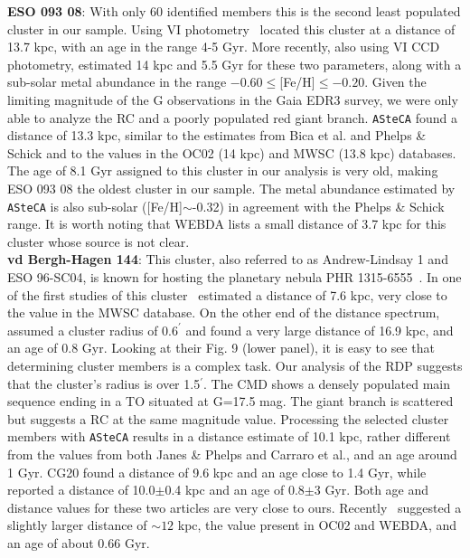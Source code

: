 \documentclass{aa}
\begin{document}
\begin{appendix}
  \noindent \textbf{ESO 093 08}: With only 60 identified members this is the second least
  populated cluster in our sample. Using VI photometry~\cite{Bica_1999} located
  this cluster at a distance of 13.7 kpc, with an age in the range 4-5 Gyr.
  More recently, also using VI CCD photometry, \cite{Phelps_2003} estimated 14
  kpc and 5.5 Gyr for these two parameters, along with a sub-solar metal
  abundance in the range $-0.60\leq$[Fe/H]$\leq-0.20$.
  Given the limiting magnitude of the G observations in the Gaia EDR3 survey, we
  were only able to analyze the RC and a poorly populated red giant branch.
  \texttt{ASteCA} found a distance of 13.3 kpc, similar to the estimates from
  Bica et al. and Phelps \& Schick and to  the values in the OC02 (14 kpc)
  and MWSC (13.8 kpc) databases.
  The age of 8.1 Gyr assigned to this cluster in our analysis is very
  old, making ESO 093 08 the oldest cluster in our sample. The metal
  abundance estimated by \texttt{ASteCA} is also sub-solar ([Fe/H]$\sim$-0.32)
  in agreement with the Phelps \& Schick range. It is worth noting that WEBDA
  lists a small distance of 3.7 kpc for this cluster whose source is not
  clear.\\

  \noindent \textbf{vd Bergh-Hagen 144}: This cluster, also referred to as Andrew-Lindsay
  1 and ESO 96-SC04, is known for hosting the planetary nebula PHR
  1315-6555~\citep{Parker_2011}.
  In one of the first studies of this cluster~\cite{Janes_1994} estimated a
  distance of 7.6 kpc, very close to the value in the MWSC database. On the
  other end of the distance spectrum,
  \cite{Carraro_2005_neglected} assumed a cluster radius of $0.6^{\prime}$ and
  found a very large distance of 16.9 kpc, and an age of 0.8 Gyr. Looking at
  their Fig. 9 (lower panel), it is easy to see that determining cluster members
  is a complex task. Our analysis of the RDP suggests that the cluster's radius
  is over 1.5$^{\prime}$. The CMD shows a densely populated main sequence ending
  in a TO situated at G=17.5 mag. The giant branch is scattered but suggests a
  RC at the same magnitude value.
  Processing the selected cluster members with \texttt{ASteCA} results in a
  distance estimate of 10.1 kpc, rather different from the values
  from both Janes \& Phelps and Carraro et al., and an age around 1 Gyr.
  CG20 found a distance of 9.6 kpc and an age close to 1.4 Gyr,
  while~\cite{Majaess_2014} reported a distance of 10.0$\pm$0.4 kpc and an
  age of 0.8$\pm$3 Gyr. Both age and distance values for these two articles are
  very close to ours. Recently~\cite{Fragkou_2019} suggested a slightly larger
  distance of $\sim12$ kpc, the value present in OC02 and WEBDA, and an age of
  about 0.66 Gyr.\\


\end{appendix}
\end{document}
